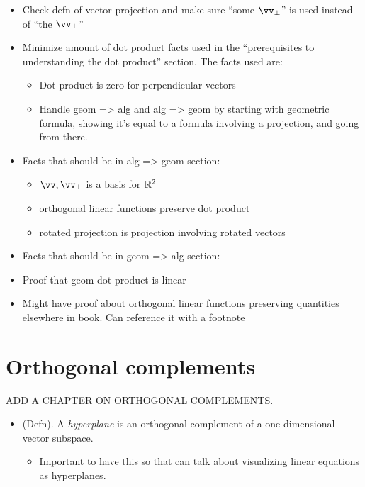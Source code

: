 \begin{itemize}
    \item Check defn of vector projection and make sure “some $\vv_\perp$” is used instead of “the $\vv_\perp$”
    \item Minimize amount of dot product facts used in the “prerequisites to understanding the dot product” section. The facts used are:
    \begin{itemize}
        \item Dot product is zero for perpendicular vectors
        \item Handle geom => alg and alg => geom by starting with geometric formula, showing it’s equal to a formula involving a projection, and going from there.
    \end{itemize}
    \item Facts that should be in alg => geom section:
    \begin{itemize}
        \item $\vv, \vv_\perp$ is a basis for $\mathbb{R}^2$
        \item orthogonal linear functions preserve dot product
        \item rotated projection is projection involving rotated vectors
    \end{itemize}
    \item Facts that should be in geom => alg section:
    \item Proof that geom dot product is linear
    \item Might have proof about orthogonal linear functions preserving quantities elsewhere in book. Can reference it with a footnote
\end{itemize}

\section*{Orthogonal complements}

ADD A CHAPTER ON ORTHOGONAL COMPLEMENTS.

\begin{itemize}
    \item (Defn). A \textit{hyperplane} is an orthogonal complement of a one-dimensional vector subspace.
    \begin{itemize}
        \item Important to have this so that can talk about visualizing linear equations as hyperplanes.
    \end{itemize}
\end{itemize}

